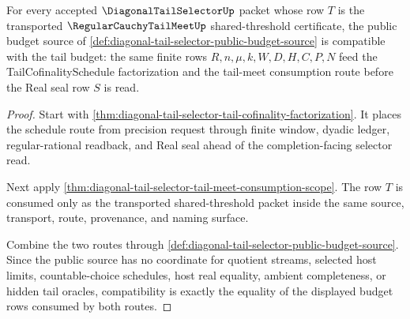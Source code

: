 \begin{theorem}
\label{thm:diagonal-tail-selector-tail-budget-compatibility}
For every accepted $\DiagonalTailSelectorUp$ packet whose row $T$ is the
transported $\RegularCauchyTailMeetUp$ shared-threshold certificate, the
public budget source of
\autoref{def:diagonal-tail-selector-public-budget-source} is compatible
with the tail budget: the same finite rows $R,n,\mu,k,W,D,H,C,P,N$ feed the
TailCofinalitySchedule factorization and the tail-meet consumption route
before the Real seal row $S$ is read.
\end{theorem}
\begin{proof}
Start with \autoref{thm:diagonal-tail-selector-tail-cofinality-factorization}.
It places the schedule route from precision request through finite window,
dyadic ledger, regular-rational readback, and Real seal ahead of the
completion-facing selector read.

Next apply \autoref{thm:diagonal-tail-selector-tail-meet-consumption-scope}.
The row $T$ is consumed only as the transported shared-threshold packet
inside the same source, transport, route, provenance, and naming surface.

Combine the two routes through
\autoref{def:diagonal-tail-selector-public-budget-source}. Since the public
source has no coordinate for quotient streams, selected host limits,
countable-choice schedules, host real equality, ambient completeness, or
hidden tail oracles, compatibility is exactly the equality of the displayed
budget rows consumed by both routes.
\end{proof}

